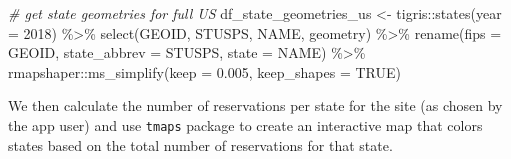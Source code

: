 \documentclass[
  11 pt,
  openany]{book}
\newenvironment{Shaded}{\begin{snugshade}}{\end{snugshade}}
\newcommand{\AttributeTok}[1]{\textcolor[rgb]{0.77,0.63,0.00}{#1}}
\newcommand{\CommentTok}[1]{\textcolor[rgb]{0.56,0.35,0.01}{\textit{#1}}}
\newcommand{\ConstantTok}[1]{\textcolor[rgb]{0.00,0.00,0.00}{#1}}
\newcommand{\DecValTok}[1]{\textcolor[rgb]{0.00,0.00,0.81}{#1}}
\newcommand{\FloatTok}[1]{\textcolor[rgb]{0.00,0.00,0.81}{#1}}
\newcommand{\FunctionTok}[1]{\textcolor[rgb]{0.00,0.00,0.00}{#1}}
\newcommand{\NormalTok}[1]{#1}
\newcommand{\OtherTok}[1]{\textcolor[rgb]{0.56,0.35,0.01}{#1}}
\newcommand{\SpecialCharTok}[1]{\textcolor[rgb]{0.00,0.00,0.00}{#1}}
\begin{document}
\begin{Shaded}
\begin{Highlighting}[]
\CommentTok{\# get state geometries for full US}
\NormalTok{df\_state\_geometries\_us }\OtherTok{\textless{}{-}}\NormalTok{ tigris}\SpecialCharTok{::}\FunctionTok{states}\NormalTok{(}\AttributeTok{year =} \DecValTok{2018}\NormalTok{) }\SpecialCharTok{\%\textgreater{}\%}
  \FunctionTok{select}\NormalTok{(GEOID, STUSPS, NAME, geometry) }\SpecialCharTok{\%\textgreater{}\%} 
  \FunctionTok{rename}\NormalTok{(}\AttributeTok{fips =}\NormalTok{ GEOID,}
         \AttributeTok{state\_abbrev =}\NormalTok{ STUSPS,}
         \AttributeTok{state =}\NormalTok{ NAME) }\SpecialCharTok{\%\textgreater{}\%} 
\NormalTok{  rmapshaper}\SpecialCharTok{::}\FunctionTok{ms\_simplify}\NormalTok{(}\AttributeTok{keep =} \FloatTok{0.005}\NormalTok{, }\AttributeTok{keep\_shapes =} \ConstantTok{TRUE}\NormalTok{)}
\end{Highlighting}
\end{Shaded}

We then calculate the number of reservations per state for the site (as chosen by the app user) and use \texttt{tmaps} package \citep{R-tmap} to create an interactive map that colors states based on the total number of reservations for that state.
\end{document}
